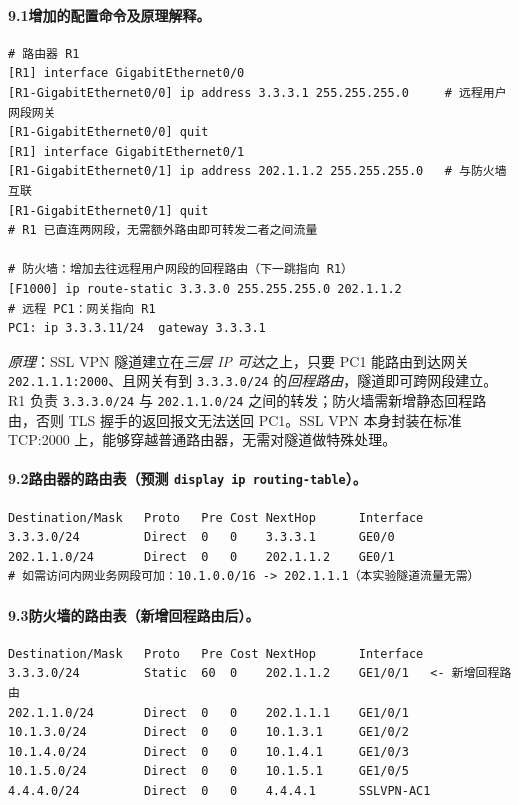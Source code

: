 \documentclass[12pt,a4paper]{article}
\begin{document}
\paragraph{9.1\quad 增加的配置命令及原理解释。}
\begin{lstlisting}
# 路由器 R1
[R1] interface GigabitEthernet0/0
[R1-GigabitEthernet0/0] ip address 3.3.3.1 255.255.255.0     # 远程用户网段网关
[R1-GigabitEthernet0/0] quit
[R1] interface GigabitEthernet0/1
[R1-GigabitEthernet0/1] ip address 202.1.1.2 255.255.255.0   # 与防火墙互联
[R1-GigabitEthernet0/1] quit
# R1 已直连两网段，无需额外路由即可转发二者之间流量

# 防火墙：增加去往远程用户网段的回程路由（下一跳指向 R1）
[F1000] ip route-static 3.3.3.0 255.255.255.0 202.1.1.2
# 远程 PC1：网关指向 R1
PC1: ip 3.3.3.11/24  gateway 3.3.3.1
\end{lstlisting}
\emph{原理}：SSL VPN 隧道建立在\emph{三层 IP 可达}之上，只要 PC1 能路由到达网关 \texttt{202.1.1.1:2000}、且网关有到 \texttt{3.3.3.0/24} 的\emph{回程路由}，隧道即可跨网段建立。R1 负责 \texttt{3.3.3.0/24} 与 \texttt{202.1.1.0/24} 之间的转发；防火墙需新增静态回程路由，否则 TLS 握手的返回报文无法送回 PC1。SSL VPN 本身封装在标准 TCP:2000 上，能够穿越普通路由器，无需对隧道做特殊处理。

\paragraph{9.2\quad 路由器的路由表（预测 \texttt{display ip routing-table}）。}
\begin{lstlisting}[basicstyle=\ttfamily\scriptsize]
Destination/Mask   Proto   Pre Cost NextHop      Interface
3.3.3.0/24         Direct  0   0    3.3.3.1      GE0/0
202.1.1.0/24       Direct  0   0    202.1.1.2    GE0/1
# 如需访问内网业务网段可加：10.1.0.0/16 -> 202.1.1.1（本实验隧道流量无需）
\end{lstlisting}

\paragraph{9.3\quad 防火墙的路由表（新增回程路由后）。}
\begin{lstlisting}[basicstyle=\ttfamily\scriptsize]
Destination/Mask   Proto   Pre Cost NextHop      Interface
3.3.3.0/24         Static  60  0    202.1.1.2    GE1/0/1   <- 新增回程路由
202.1.1.0/24       Direct  0   0    202.1.1.1    GE1/0/1
10.1.3.0/24        Direct  0   0    10.1.3.1     GE1/0/2
10.1.4.0/24        Direct  0   0    10.1.4.1     GE1/0/3
10.1.5.0/24        Direct  0   0    10.1.5.1     GE1/0/5
4.4.4.0/24         Direct  0   0    4.4.4.1      SSLVPN-AC1
\end{lstlisting}
\end{document}
